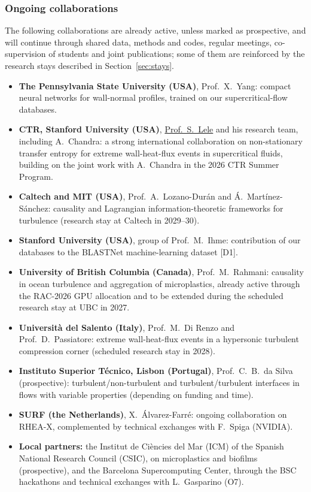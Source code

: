 \documentclass[11pt]{article}
\newcommand{\NEW}[1]{\iffinal #1\else{\color{red}#1}\fi}
\begin{document}
\subsubsection{Ongoing collaborations}
The following collaborations are already active, unless marked as prospective, and will continue through shared data, methods and codes, regular meetings, co-supervision of students and joint publications; some of them are reinforced by the research stays described in Section~\ref{sec:stays}.
\begin{itemize}
  \item \textbf{The Pennsylvania State University (USA)}, Prof.\ X.\ Yang: compact neural networks
  for wall-normal profiles, trained on our supercritical-flow databases.
  \item \textbf{CTR, Stanford University (USA)},
  \href{https://me.stanford.edu/people/sanjiva-lele}{Prof.\ S.\ Lele} and his research team, including   A.\ Chandra: a strong international collaboration on non-stationary transfer entropy for extreme wall-heat-flux events in supercritical fluids, building on the joint work with A.\ Chandra in the 2026 CTR Summer Program.
  \item \textbf{Caltech and MIT (USA)}, Prof.\ A.\ Lozano-Dur\'an and \'A.\ Mart\'inez-S\'anchez:   causality and Lagrangian information-theoretic frameworks for turbulence (research stay at Caltech in 2029--30).
  \item \textbf{Stanford University (USA)}, group of Prof.\ M.\ Ihme: contribution of our databases to the BLASTNet machine-learning dataset [D1].
  \item \textbf{University of British Columbia (Canada)}, Prof.\ M.\ Rahmani: causality in ocean turbulence and aggregation of microplastics, already active through the RAC-2026 GPU allocation and to be extended during the scheduled research stay at UBC in 2027.
  \item \textbf{Universit\`a del Salento (Italy)}, Prof.\ M.\ Di Renzo and Prof.\ D.\ Passiatore:
  extreme wall-heat-flux events in a hypersonic turbulent compression corner (scheduled research stay in 2028).
  \item \textbf{Instituto Superior T\'ecnico, Lisbon (Portugal)}, Prof.\ C.\ B.\ da Silva
  (prospective): turbulent/non-turbulent and turbulent/turbulent interfaces in flows with
  variable properties (depending on funding and time).
  \item \textbf{SURF (the Netherlands)}, X.\ \'Alvarez-Farr\'e: ongoing collaboration on RHEA-X,
  complemented by technical exchanges with F.\ Spiga (NVIDIA).
  \item \textbf{Local partners:} the Institut de Ci\`encies del Mar (ICM) \NEW{of the Spanish National Research Council (CSIC)}, on microplastics and biofilms (prospective), and the Barcelona Supercomputing Center, through the BSC hackathons and technical exchanges with L.\ Gasparino (O7).
\end{itemize}
\end{document}
